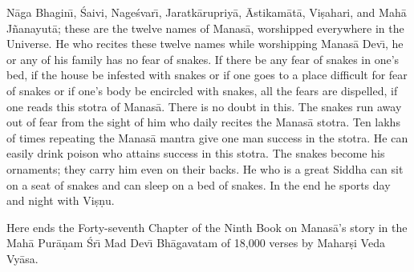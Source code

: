 N\=aga Bhagin\={\i}, \'Saivi, Nage\'svar\={\i}, Jaratk\=arupriy\=a, \=Astikam\=at\=a, Vi\d{s}ahari, and Mah\=a J\~nanayut\=a; these are the twelve names of Manas\=a, worshipped everywhere in the Universe. He who recites these twelve names while worshipping Manas\=a Dev\={\i}, he or any of his family has no fear of snakes. If there be any fear of snakes in one's bed, if the house be infested with snakes or if one goes to a place difficult for fear of snakes or if one's body be encircled with snakes, all the fears are dispelled, if one reads this stotra of Manas\=a. There is no doubt in this. The snakes run away out of fear from the sight of him who daily recites the Manas\=a stotra. Ten lakhs of times repeating the Manas\=a mantra give one man success in the stotra. He can easily drink poison who attains success in this stotra. The snakes become his ornaments; they carry him even on their backs. He who is a great Siddha can sit on a seat of snakes and can sleep on a bed of snakes. In the end he sports day and night with Vi\d{s}\d{n}u.

Here ends the Forty-seventh Chapter of the Ninth Book on Manas\=a's story in the Mah\=a Pur\=a\d{n}am \'Sr\={\i} Mad Dev\={\i} Bh\=agavatam of 18,000 verses by Mahar\d{s}i Veda Vy\=asa.



